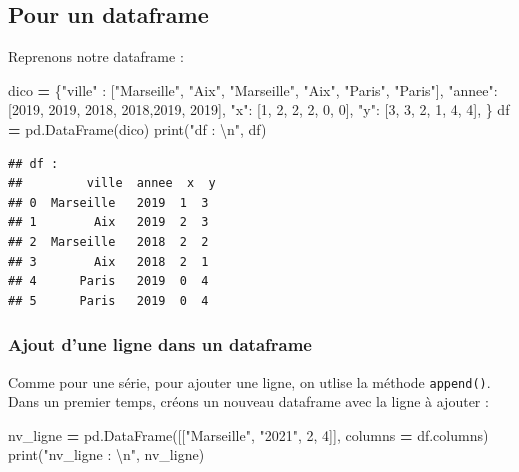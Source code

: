 \documentclass[12pt,]{book}
\newenvironment{Shaded}{\begin{snugshade}}{\end{snugshade}}
\newcommand{\DecValTok}[1]{\textcolor[rgb]{0.00,0.00,0.81}{#1}}
\newcommand{\CharTok}[1]{\textcolor[rgb]{0.31,0.60,0.02}{#1}}
\newcommand{\StringTok}[1]{\textcolor[rgb]{0.31,0.60,0.02}{#1}}
\newcommand{\OperatorTok}[1]{\textcolor[rgb]{0.81,0.36,0.00}{\textbf{#1}}}
\newcommand{\BuiltInTok}[1]{#1}
\newcommand{\NormalTok}[1]{#1}
\numberwithin{equation}{section}
\numberwithin{countremarque}{section}
\begin{document}
\subsection{Pour un dataframe}\label{pour-un-dataframe-1}

Reprenons notre dataframe :

\begin{Shaded}
\begin{Highlighting}[]
\NormalTok{dico }\OperatorTok{=}\NormalTok{ \{}\StringTok{"ville"}\NormalTok{ : [}\StringTok{"Marseille"}\NormalTok{, }\StringTok{"Aix"}\NormalTok{,}
                   \StringTok{"Marseille"}\NormalTok{, }\StringTok{"Aix"}\NormalTok{, }\StringTok{"Paris"}\NormalTok{, }\StringTok{"Paris"}\NormalTok{],}
        \StringTok{"annee"}\NormalTok{: [}\DecValTok{2019}\NormalTok{, }\DecValTok{2019}\NormalTok{, }\DecValTok{2018}\NormalTok{, }\DecValTok{2018}\NormalTok{,}\DecValTok{2019}\NormalTok{, }\DecValTok{2019}\NormalTok{],}
        \StringTok{"x"}\NormalTok{: [}\DecValTok{1}\NormalTok{, }\DecValTok{2}\NormalTok{, }\DecValTok{2}\NormalTok{, }\DecValTok{2}\NormalTok{, }\DecValTok{0}\NormalTok{, }\DecValTok{0}\NormalTok{],}
        \StringTok{"y"}\NormalTok{: [}\DecValTok{3}\NormalTok{, }\DecValTok{3}\NormalTok{, }\DecValTok{2}\NormalTok{, }\DecValTok{1}\NormalTok{, }\DecValTok{4}\NormalTok{, }\DecValTok{4}\NormalTok{],}
\NormalTok{       \} }
\NormalTok{df }\OperatorTok{=}\NormalTok{ pd.DataFrame(dico)}
\BuiltInTok{print}\NormalTok{(}\StringTok{"df : }\CharTok{\textbackslash{}n}\StringTok{"}\NormalTok{, df)}
\end{Highlighting}
\end{Shaded}

\begin{lstlisting}
## df : 
##         ville  annee  x  y
## 0  Marseille   2019  1  3
## 1        Aix   2019  2  3
## 2  Marseille   2018  2  2
## 3        Aix   2018  2  1
## 4      Paris   2019  0  4
## 5      Paris   2019  0  4
\end{lstlisting}

\subsubsection{Ajout d'une ligne dans un
dataframe}\label{pandas-ajout-ligne-df}

Comme pour une série, pour ajouter une ligne, on utlise la méthode
\texttt{append()}. Dans un premier temps, créons un nouveau dataframe
avec la ligne à ajouter :

\begin{Shaded}
\begin{Highlighting}[]
\NormalTok{nv_ligne }\OperatorTok{=}\NormalTok{ pd.DataFrame([[}\StringTok{"Marseille"}\NormalTok{, }\StringTok{"2021"}\NormalTok{, }\DecValTok{2}\NormalTok{, }\DecValTok{4}\NormalTok{]],}
\NormalTok{                       columns }\OperatorTok{=}\NormalTok{ df.columns)}
\BuiltInTok{print}\NormalTok{(}\StringTok{"nv_ligne : }\CharTok{\textbackslash{}n}\StringTok{"}\NormalTok{, nv_ligne)}
\end{Highlighting}
\end{Shaded}
\end{document}
